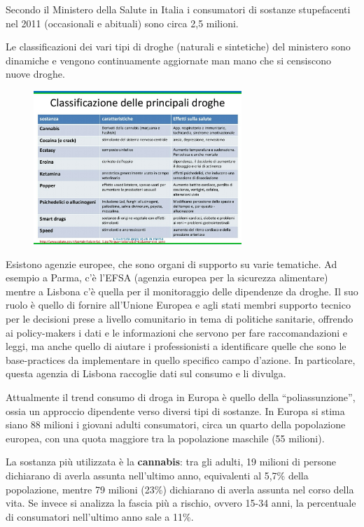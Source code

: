 Secondo il Ministero della Salute in Italia i consumatori di sostanze
stupefacenti nel 2011 (occasionali e abituali) sono circa 2,5 milioni.

Le classificazioni dei vari tipi di droghe (naturali e sintetiche) del
ministero sono dinamiche e vengono continuamente aggiornate man mano che
si censiscono nuove droghe.

\begin{figure}[!ht]
\centering
	\includegraphics[width=0.7\textwidth]{18/image1.jpeg}
\end{figure}

Esistono agenzie europee, che sono organi di supporto su varie
tematiche. Ad esempio a Parma, c'è l'EFSA (agenzia europea per la
sicurezza alimentare) mentre a Lisbona c'è quella per il monitoraggio
delle dipendenze da droghe. Il suo ruolo è quello di fornire all'Unione
Europea e agli stati membri supporto tecnico per le decisioni prese a
livello comunitario in tema di politiche sanitarie, offrendo ai
policy-makers i dati e le informazioni che servono per fare
raccomandazioni e leggi, ma anche quello di aiutare i professionisti a
identificare quelle che sono le base-practices da implementare in quello
specifico campo d'azione. In particolare, questa agenzia di Lisbona
raccoglie dati sul consumo e li divulga.

Attualmente il trend consumo di droga in Europa è quello della
``poliassunzione'', ossia un approccio dipendente verso diversi tipi di
sostanze. In Europa si stima siano 88 milioni i giovani adulti
consumatori, circa un quarto della popolazione europea, con una quota
maggiore tra la popolazione maschile (55 milioni).

La sostanza più utilizzata è la \textbf{cannabis}: tra gli adulti, 19
milioni di persone dichiarano di averla assunta nell'ultimo anno,
equivalenti al 5,7\% della popolazione, mentre 79 milioni (23\%)
dichiarano di averla assunta nel corso della vita. Se invece si analizza
la fascia più a rischio, ovvero 15-34 anni, la percentuale di
consumatori nell'ultimo anno sale a 11\%.

